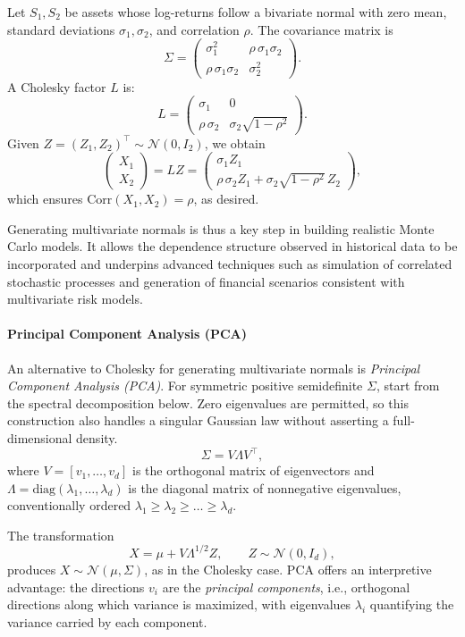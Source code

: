 \begin{example}
Let \(S_1, S_2\) be assets whose log-returns follow a bivariate normal with zero mean, 
standard deviations \(\sigma_1, \sigma_2\), and correlation \(\rho\).
The covariance matrix is
\[
\Sigma = 
\begin{pmatrix}
\sigma_1^2 & \rho\,\sigma_1\sigma_2 \\
\rho\,\sigma_1\sigma_2 & \sigma_2^2
\end{pmatrix}.
\]
A Cholesky factor \(L\) is:
\[
L =
\begin{pmatrix}
\sigma_1 & 0 \\
\rho\,\sigma_2 & \sigma_2\sqrt{1-\rho^2}
\end{pmatrix}.
\]
Given \(Z = (Z_1, Z_2)^\top \sim \mathcal{N}(0, I_2)\), 
we obtain
\[
\begin{pmatrix} X_1 \\ X_2 \end{pmatrix}
= LZ =
\begin{pmatrix}
\sigma_1 Z_1 \\
\rho\,\sigma_2 Z_1 + \sigma_2 \sqrt{1-\rho^2}\,Z_2
\end{pmatrix},
\]
which ensures \(\mathrm{Corr}(X_1, X_2) = \rho\), as desired.
\end{example}

\bigskip
Generating multivariate normals is thus a key step 
in building realistic Monte Carlo models. 
It allows the dependence structure observed in historical data to be incorporated 
and underpins advanced techniques such as simulation of correlated stochastic processes 
and generation of financial scenarios consistent with multivariate risk models.
\paragraph{Principal Component Analysis (PCA)}
\begin{remark}
An alternative to Cholesky for generating multivariate normals is \emph{Principal Component Analysis (PCA)}. 
For symmetric positive semidefinite $\Sigma$, start from the
spectral decomposition below. Zero eigenvalues are permitted, so this
construction also handles a singular Gaussian law without asserting a
full-dimensional density.
\[
\Sigma = V \Lambda V^\top,
\]
where \(V = [v_1, \dots, v_d]\) is the orthogonal matrix of eigenvectors and \(\Lambda = \mathrm{diag}(\lambda_1, \dots, \lambda_d)\) is the diagonal matrix of nonnegative eigenvalues, conventionally ordered \(\lambda_1 \geq \lambda_2 \geq \dots \geq \lambda_d\).

The transformation
\[
X = \mu + V \Lambda^{1/2} Z, \qquad Z \sim \mathcal{N}(0, I_d),
\]
produces \(X \sim \mathcal{N}(\mu, \Sigma)\), as in the Cholesky case.
PCA offers an interpretive advantage: 
the directions \(v_i\) are the \emph{principal components}, i.e., orthogonal directions along which variance is maximized, with eigenvalues \(\lambda_i\) quantifying the variance carried by each component.
\end{remark}

